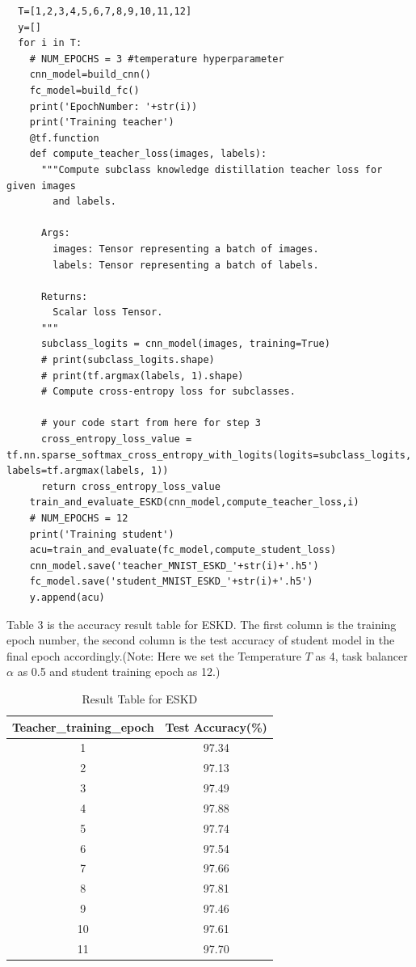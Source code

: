 \documentclass[conference]{IEEEtran}
\begin{document}
  \begin{lstlisting}
  T=[1,2,3,4,5,6,7,8,9,10,11,12]
  y=[]
  for i in T:
    # NUM_EPOCHS = 3 #temperature hyperparameter
    cnn_model=build_cnn()
    fc_model=build_fc()
    print('EpochNumber: '+str(i))
    print('Training teacher')
    @tf.function
    def compute_teacher_loss(images, labels):
      """Compute subclass knowledge distillation teacher loss for given images
        and labels.
  
      Args:
        images: Tensor representing a batch of images.
        labels: Tensor representing a batch of labels.
  
      Returns:
        Scalar loss Tensor.
      """
      subclass_logits = cnn_model(images, training=True)
      # print(subclass_logits.shape)
      # print(tf.argmax(labels, 1).shape)
      # Compute cross-entropy loss for subclasses.
  
      # your code start from here for step 3
      cross_entropy_loss_value = tf.nn.sparse_softmax_cross_entropy_with_logits(logits=subclass_logits, labels=tf.argmax(labels, 1))
      return cross_entropy_loss_value
    train_and_evaluate_ESKD(cnn_model,compute_teacher_loss,i)
    # NUM_EPOCHS = 12
    print('Training student')
    acu=train_and_evaluate(fc_model,compute_student_loss)
    cnn_model.save('teacher_MNIST_ESKD_'+str(i)+'.h5')
    fc_model.save('student_MNIST_ESKD_'+str(i)+'.h5')
    y.append(acu)
  \end{lstlisting}\par
  Table 3 is the accuracy result table for ESKD. The first column is the training epoch number, the second column is the test accuracy of student model in the final epoch accordingly.(Note: Here we set the Temperature $T$ as 4, task balancer $\alpha$ as 0.5 and student training epoch as 12.)\par
  \begin{table}[h]
  \centering
  \begin{tabular}{|c|c|}
  \hline
  Teacher\_training\_epoch & Test Accuracy(\%) \\ \hline
  1                        & 97.34         \\ \hline
  2                        & 97.13         \\ \hline
  3                        & 97.49         \\ \hline
  4                        & 97.88         \\ \hline
  5                        & 97.74         \\ \hline
  6                        & 97.54         \\ \hline
  7                        & 97.66         \\ \hline
  8                        & 97.81         \\ \hline
  9                        & 97.46         \\ \hline
  10                       & 97.61         \\ \hline
  11                       & 97.70         \\ \hline
  \end{tabular}
  \caption{Result Table for ESKD}
  \end{table}
\end{document}
